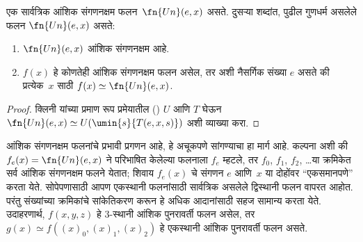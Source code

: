 \documentclass[../../../include/open-logic-section]{subfiles}
\begin{document}

\begin{thm}
एक सार्वत्रिक आंशिक संगणनक्षम फलन~$\fn{Un}(e,x)$ असते. दुसऱ्या
शब्दांत, पुढील गुणधर्म असलेले फलन $\fn{Un}(e,x)$ असते:
\begin{enumerate}
\item $\fn{Un}(e,x)$ आंशिक संगणनक्षम आहे.
\item $f(x)$ हे कोणतेही आंशिक संगणनक्षम फलन असेल, तर अशी नैसर्गिक
संख्या $e$ असते की प्रत्येक~$x$ साठी $f(x) \simeq \fn{Un}(e,x)$.
\end{enumerate}
\end{thm}

\begin{proof}
क्लिनी यांच्या प्रमाण रूप प्रमेयातील ()
$U$ आणि $T$ घेऊन $\fn{Un}(e,x) \simeq U(\umin{s}{T(e,x,s)})$
अशी व्याख्या करा.
\end{proof}

\begin{explain}
आंशिक संगणनक्षम फलनांचे प्रभावी प्रगणन आहे, हे अचूकपणे सांगण्याचा
हा मार्ग आहे. कल्पना अशी की $f_e(x) = \fn{Un}(e,x)$ ने परिभाषित
केलेल्या फलनाला $f_e$ म्हटले, तर $f_0$, $f_1$, $f_2$, \dots या
क्रमिकेत सर्व आंशिक संगणनक्षम फलने येतात; शिवाय $f_e(x)$ चे
संगणन $e$ आणि~$x$ या दोहोंवर ``एकसमानपणे'' करता येते. सोपेपणासाठी
आपण एकस्थानी फलनांसाठी सार्वत्रिक असलेले द्विस्थानी फलन वापरत आहोत.
परंतु संख्यांच्या क्रमिकांचे सांकेतिकरण करून हे अधिक आदानांसाठी सहज
सामान्य करता येते. उदाहरणार्थ, $f(x,y,z)$ हे $3$-स्थानी आंशिक
पुनरावर्ती फलन असेल, तर $g(x) \simeq f((x)_0, (x)_1, (x)_2)$
हे एकस्थानी आंशिक पुनरावर्ती फलन असते.
\end{explain}
\end{document}
